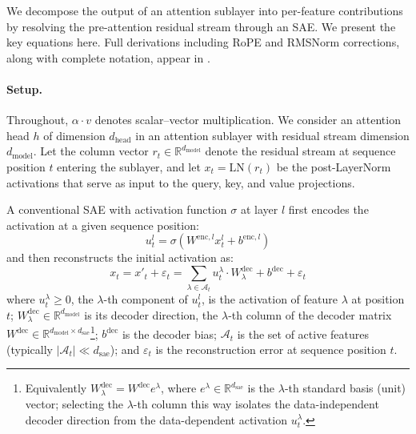 \documentclass{article}
\theoremstyle{plain}
\theoremstyle{definition}
\theoremstyle{remark}
\newcommand{\Wdec}{W^{\mathrm{dec}}}
\newcommand{\dmodel}{d_{\mathrm{model}}}
\newcommand{\dhead}{d_{\mathrm{head}}}
\newcommand{\dsae}{d_{\mathrm{sae}}}
\newcommand{\RR}{\mathbb{R}}
\begin{document}
We decompose the output of an attention sublayer into per-feature contributions by resolving the pre-attention residual stream through an SAE.
We present the key equations here. Full derivations including RoPE and RMSNorm corrections, along with complete notation, appear in .

\paragraph{Setup.} Throughout, $\alpha \cdot v$ denotes scalar--vector multiplication. We consider an attention head $h$ of dimension $\dhead$ in an attention sublayer with residual stream dimension $\dmodel$. Let the column vector $r_t \in \RR^{\dmodel}$ denote the residual stream at sequence position $t$ entering the sublayer, and let $x_t = \mathrm{LN}(r_t)$ be the post-LayerNorm activations that serve as input to the query, key, and value projections.

A conventional SAE with activation function $\sigma$ at layer $l$ first encodes the activation at a given sequence position:
\begin{equation}
    u^l_t=\sigma(W^{\text{enc},l}x^l_t+b^{\text{enc},l})
\end{equation}
and then reconstructs the initial activation as:
\begin{equation}
    x_t = x{'}_t+\varepsilon_t=\sum_{\lambda \in \mathcal{A}_t}u_t^\lambda \cdot W^{\mathrm{dec}}_\lambda + b^{\mathrm{dec}} +\varepsilon_t
    \label{eq:sae}
\end{equation}
where $u_t^\lambda \geq 0$, the $\lambda$-th component of $u^l_t$, is the activation of feature $\lambda$ at position $t$; $W^{\mathrm{dec}}_\lambda \in \RR^{\dmodel}$ is its decoder direction, the $\lambda$-th column of the decoder matrix $W^{\mathrm{dec}} \in \RR^{\dmodel \times \dsae}$\footnote{Equivalently $W^{\mathrm{dec}}_\lambda = W^{\mathrm{dec}} e^\lambda$, where $e^\lambda \in \RR^{\dsae}$ is the $\lambda$-th standard basis (unit) vector; selecting the $\lambda$-th column this way isolates the data-independent decoder direction from the data-dependent activation $u_t^\lambda$.}; $b^{\mathrm{dec}}$ is the decoder bias; $\mathcal{A}_t$ is the set of active features (typically $|\mathcal{A}_t| \ll \dsae$); and $\varepsilon_t$ is the reconstruction error at sequence position $t$.
\end{document}
